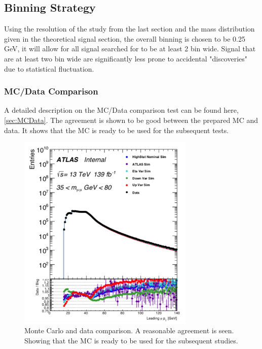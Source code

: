 \subsection{Binning Strategy}
Using the resolution of the study from the last section and the mass distribution given in the theoretical signal section, the overall binning is chosen to be 0.25 GeV, it will allow for all signal searched for to be at least 2 bin wide. Signal that are at least two bin wide are significantly less prone to accidental "discoveries" due to statistical fluctuation.

\subsubsection{MC/Data Comparison}
A detailed description on the MC/Data comparison test can be found here,\ref{sec:MCData}.  
The agreement is shown to be good between the prepared MC and data. It shows that the MC is ready to be used for the subsequent tests.

\begin{figure}[!htb]
    \begin{center}
        \includegraphics[width=0.75\textwidth]{figures/chapter_dimuon/MCDataCompare}
        \caption{
        Monte Carlo and data comparison. A reasonable agreement is seen. Showing that the MC is ready to be used for the subsequent studies.
        }
    \end{center}
\end{figure}

